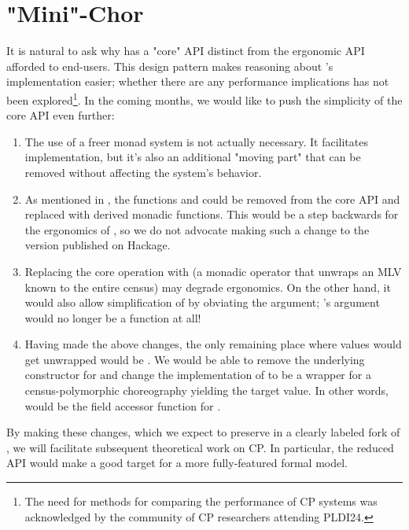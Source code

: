 \section{"Mini"-Chor}
\label{sec:future-implementation}
It is natural to ask why \MultiChor has a "core" API distinct from the ergonomic API afforded to end-users.
This design pattern makes reasoning about \MultiChor's implementation easier;
whether there are any performance implications has not been explored\footnote{
  The need for methods for comparing the performance of CP systems was acknowledged by the community
  of CP researchers attending PLDI24.
}.
In the coming months, we would like to push the simplicity of the core API even further:
\begin{enumerate}
  \item The use of a freer monad system is not actually necessary.
        It facilitates implementation, but it's also an additional "moving part" that can be removed
        without affecting the system's behavior.
\item As mentioned in , the functions  and 
        could be removed from the core API and replaced with derived monadic functions.
        This would be a step backwards for the ergonomics of \MultiChor,
        so we do not advocate making such a change to the version published on Hackage.
  \item Replacing the core operation  with 
        (a monadic operator that unwraps an MLV known to the entire census)
        may degrade ergonomics.
        On the other hand, it would also allow simplification of 
        by obviating the  argument;
        \ie {}'s argument would no longer be a function at all!
  \item Having made the above changes, the only remaining place where  values would get unwrapped
        would be .
        We would be able to remove the underlying  constructor for 
        and change the implementation of  to be a  wrapper for
        a census-polymorphic choreography yielding the target value.
        In other words,  would be the field accessor function for .
\end{enumerate}

By making these changes, which we expect to preserve in a clearly labeled fork of \MultiChor,
we will facilitate subsequent theoretical work on CP.
In particular, the reduced API would make a good target for a more fully-featured formal model.



